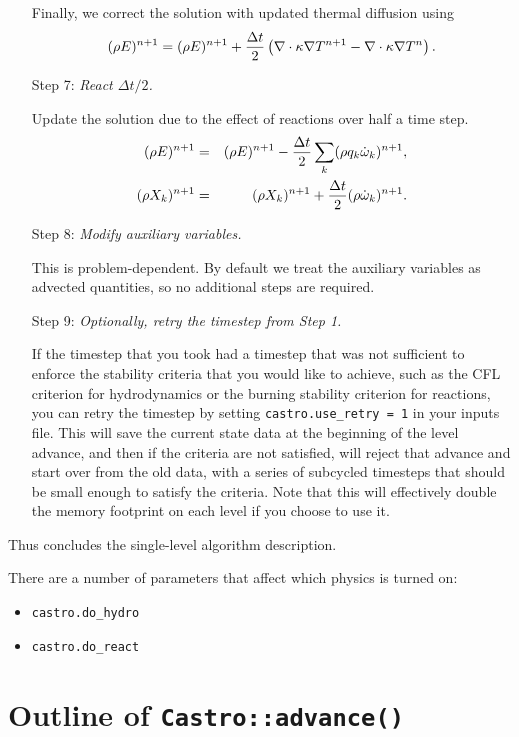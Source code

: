 \begin{enumerate}
Finally, we correct the solution with updated thermal diffusion using
\begin{equation}
(\rho E)^{n+1} = (\rho E)^{n+1} + \frac{\Delta t}{2}\left(\nabla\cdot\kappa\nabla T^{n+1} - \nabla\cdot\kappa\nabla T^n\right).
\end{equation}
\item[Step 7:] {\em React $\Delta t/2$.}

Update the solution due to the effect of reactions over half a time step.
\begin{eqnarray}
(\rho E)^{n+1} &=& (\rho E)^{n+1} - \frac{\Delta t}{2}\sum_k(\rho q_k\dot\omega_k)^{n+1},\\
(\rho X_k)^{n+1} &=& (\rho X_k)^{n+1} + \frac{\Delta t}{2}(\rho\dot\omega_k)^{n+1}.
\end{eqnarray}
\item[Step 8:] {\em Modify auxiliary variables.}

This is problem-dependent.  By default we treat the auxiliary
variables as advected quantities, so no additional steps are required.

\item[Step 9:] {\em Optionally, retry the timestep from Step 1.}

If the timestep that you took had a timestep that was not sufficient to
enforce the stability criteria that you would like to achieve, such as
the CFL criterion for hydrodynamics or the burning stability criterion
for reactions, you can retry the timestep by setting {\tt castro.use\_retry = 1}
in your inputs file. This will save the current state data at the beginning
of the level advance, and then if the criteria are not satisfied, will
reject that advance and start over from the old data, with a series of
subcycled timesteps that should be small enough to satisfy the criteria.
Note that this will effectively double the memory footprint on each level
if you choose to use it.

\end{enumerate}
Thus concludes the single-level algorithm description.


There are a number of parameters that affect which physics is turned on:
\begin{itemize}
\item {\tt castro.do\_hydro}
\item {\tt castro.do\_react}
\end{itemize}


\section{Outline of {\tt Castro::advance()}}


